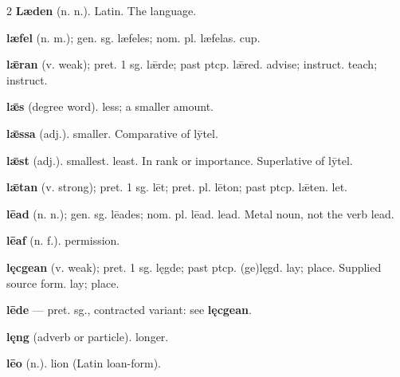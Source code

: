 \begin{multicols*}{2}
\textbf{Læden} (n. n.). Latin. The language.\par
\textbf{læfel} (n. m.); gen. sg. læfeles; nom. pl. læfelas. cup.\par
\textbf{lǣran} (v. weak); pret. 1 sg. lǣrde; past ptcp. lǣred. advise; instruct. teach; instruct.\par
\textbf{lǣs} (degree word). less; a smaller amount.\par
\textbf{lǣssa} (adj.). smaller. Comparative of lȳtel.\par
\textbf{lǣst} (adj.). smallest. least. In rank or importance. Superlative of lȳtel.\par
\textbf{lǣtan} (v. strong); pret. 1 sg. lēt; pret. pl. lēton; past ptcp. lǣten. let.\par
\textbf{lēad} (n. n.); gen. sg. lēades; nom. pl. lēad. lead. Metal noun, not the verb lead.\par
\textbf{lēaf} (n. f.). permission.\par
\textbf{lęcgean} (v. weak); pret. 1 sg. lęgde; past ptcp. (ge)lęgd. lay; place. Supplied source form. lay; place.\par
\textbf{lēde} — pret. sg., contracted variant: see \textbf{lęcgean}.\par
\textbf{lęng} (adverb or particle). longer.\par
\textbf{lēo} (n.). lion (Latin loan-form).\par

\end{multicols*}
